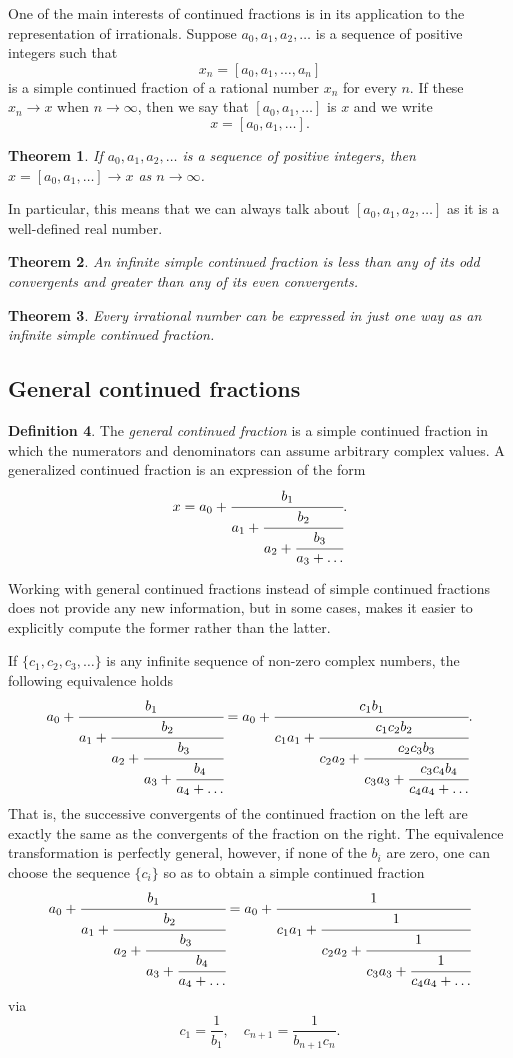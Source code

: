 \documentclass[11pt]{report}
\newtheorem{theorem}{Theorem}[section]
\theoremstyle{definition}
\newtheorem{definition}[theorem]{Definition}
\begin{document}
One of the main interests of continued fractions is in its application to the representation of irrationals. Suppose $a_0,a_1,a_2,\dots$ is a sequence of positive integers such that
\[x_n = [a_0,a_1,\dots,a_n]\]
is a simple continued fraction of a rational number $x_n$ for every $n$. If these $x_n \to x$ when $n \to \infty$, then we say that $[a_0,a_1,\dots]$ is $x$ and we write
\[x = [a_0,a_1,\dots].\]
\begin{theorem}
  If $a_0,a_1,a_2,\dots$ is a sequence of positive integers, then $x = [a_0,a_1,\dots] \to x$ as $n \to \infty$.
\end{theorem}
In particular, this means that we can always talk about $[a_0,a_1,a_2,\dots]$ as it is a well-defined real number.
\begin{theorem}
  An infinite simple continued fraction is less than any of its odd convergents and greater than any of its even convergents.
\end{theorem}
\begin{theorem}
  Every irrational number can be expressed in just one way as an infinite simple continued fraction.
\end{theorem}


\subsection{General continued fractions}
\label{sec:gener-cont-fract}

\begin{definition}
  The \textit{general continued fraction} is a simple continued fraction in which the numerators and denominators can assume arbitrary complex values. A generalized continued fraction is an expression of the form
  \[x = a_0 + \cfrac{b_1}{a_1 + \cfrac{b_2}{a_2 + \cfrac{b_3}{a_3 + \dots}}}.\]
\end{definition}
Working with general continued fractions instead of simple continued fractions does not provide any new information, but in some cases, makes it easier to explicitly compute the former rather than the latter.

If $\{c_1,c_2,c_3,\dots\}$ is any infinite sequence of non-zero complex numbers, the following equivalence holds
\[ a_0 + \cfrac{b_1}{a_1 + \cfrac{b_2}{a_2 + \cfrac{b_3}{a_3 + \cfrac{b_4}{a_4 + \dots}}}}
  = a_0 + \cfrac{c_1b_1}{c_1a_1 + \cfrac{c_1c_2b_2}{c_2a_2 + \cfrac{c_2c_3b_3}{c_3a_3 + \cfrac{c_3c_4b_4}{c_4a_4 + \dots}}}}.\]
That is, the successive convergents of the continued fraction on the left are exactly the same as the convergents of the fraction on the right. The equivalence transformation is perfectly general, however, if none of the $b_i$ are zero, one can choose the sequence $\{c_i\}$ so as to obtain a simple continued fraction
\[ a_0 + \cfrac{b_1}{a_1 + \cfrac{b_2}{a_2 + \cfrac{b_3}{a_3 + \cfrac{b_4}{a_4 + \dots}}}}
  = a_0 + \cfrac{1}{c_1a_1 + \cfrac{1}{c_2a_2 + \cfrac{1}{c_3a_3 + \cfrac{1}{c_4a_4 + \dots}}}}\]
via
\[c_1 = \frac{1}{b_1}, \quad c_{n+1} = \frac{1}{b_{n+1}c_n}.\]
\end{document}
